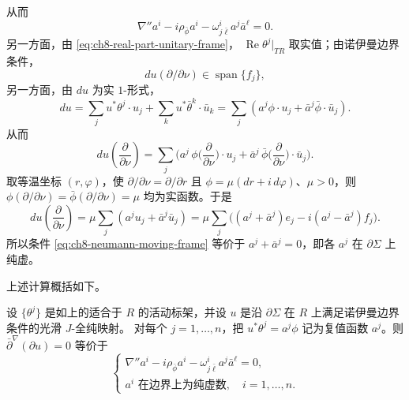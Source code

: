从而
\begin{equation}
 \nabla''a^i-i\rho_{\bar\phi}a^i-\omega^i_{j\bar\ell}a^j\bar a^\ell=0.
 \label{eq:ch8-moving-frame-equation}
\end{equation}
另一方面，由 \eqref{eq:ch8-real-part-unitary-frame}，
$\operatorname{Re}\theta^j|_{TR}$ 取实值；由诺伊曼边界条件，
\begin{equation}
 du(\partial/\partial\nu)\in\operatorname{span}\{f_j\},
 \label{eq:ch8-neumann-moving-frame}
\end{equation}
另一方面，由 $du$ 为实 $1$-形式，
\[
 du=\sum_j u^*\theta^j\cdot u_j+\sum_k u^*\bar\theta^k\cdot\bar u_k
 =\sum_j(a^j\phi\cdot u_j+\bar a^j\bar\phi\cdot\bar u_j).
\]
从而
\[
 du\left(\frac\partial{\partial\nu}\right)
 =\sum_j\bigl(a^j\,\phi\bigl(\frac\partial{\partial\nu}\bigr)\cdot u_j
   +\bar a^j\,\bar\phi\bigl(\frac\partial{\partial\nu}\bigr)\cdot\bar u_j\bigr).
\]
取等温坐标 $(r,\varphi)$，使 $\partial/\partial\nu=\partial/\partial r$ 且
$\phi=\mu(dr+i\,d\varphi)$、$\mu>0$，则 $\phi(\partial/\partial\nu)=\bar\phi(\partial/\partial\nu)=\mu$
均为实函数。于是
\[
 du\left(\frac\partial{\partial\nu}\right)
 =\mu\sum_j(a^ju_j+\bar a^j\bar u_j)
 =\mu\sum_j\bigl((a^j+\bar a^j)e_j-i(a^j-\bar a^j)f_j\bigr).
\]
所以条件 \eqref{eq:ch8-neumann-moving-frame} 等价于
$a^j+\bar a^j=0$，即各 $a^j$ 在 $\partial\Sigma$ 上纯虚。

上述计算概括如下。
\begin{proposition}\label{prop:ch8-adapted-frame-boundary-system}
设 $\{\theta^j\}$ 是如上的适合于 $R$ 的活动标架，并设 $u$ 是沿
$\partial\Sigma$ 在 $R$ 上满足诺伊曼边界条件的光滑 $J$-全纯映射。
对每个 $j=1,\ldots,n$，把 $u^*\theta^j=a^j\phi$ 记为复值函数 $a^j$。则
$\bar\partial^\nabla(\partial u)=0$ 等价于
\begin{equation}
 \begin{cases}
 \nabla''a^i-i\rho_{\bar\phi}a^i-\omega^i_{j\bar\ell}a^j\bar a^\ell=0,\\
 a^i\text{ 在边界上为纯虚数},\quad i=1,\ldots,n.
 \end{cases}
 \label{eq:ch8-adapted-frame-boundary-value}
\end{equation}
\end{proposition}

